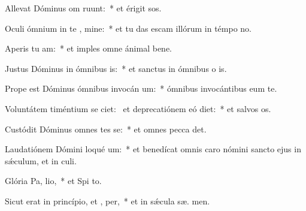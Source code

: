 \item Allevat Dóminus om  ruunt:~* et érigit  sos.
\item Oculi ómnium in te , mine:~* et tu das escam illórum in témpo no.
\item Aperis tu  am:~* et imples omne ánimal bene.
\item Justus Dóminus in ómnibus  is:~* et sanctus in ómnibus o is.
\item Prope est Dóminus ómnibus invocán um:~* ómnibus invocántibus eum  te.
\item Voluntátem timéntium se ciet:~\pscross{} et deprecatiónem eó diet:~* et salvos  os.
\item Custódit Dóminus omnes tes se:~* et omnes pecca det.
\item Laudatiónem Dómini loqué  um:~* et benedícat omnis caro nómini sancto ejus in sǽculum, et in  culi.
\item Glória Pa,  lio,~* et Spi to.
\item Sicut erat in princípio, et ,  per,~* et in sǽcula sæ. men.
